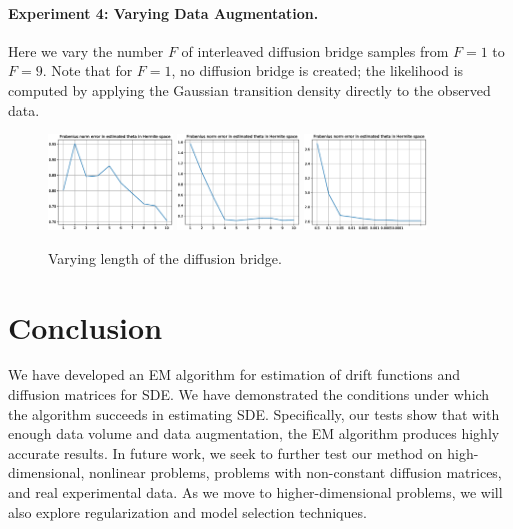 \documentclass{article}
\begin{document}
\paragraph{Experiment 4: Varying Data Augmentation.} 
Here we vary the number $F$ of interleaved diffusion bridge samples from $F=1$ to $F=9$.  Note that for $F=1$, no diffusion bridge is created; the likelihood is computed by applying the Gaussian transition density directly to the observed data.
\begin{figure}[th]
\includegraphics[height=1in]{../1dcode/varying_subintervals/plots/tp_51/hermite.eps}
\includegraphics[height=1in]{../2dcode/varying_subintervals/plots/tp_51/hermite.eps}
\includegraphics[height=1in]{../3ddampedduffing/varying_subintervals/plots/tp_51/hermite.eps}
\caption{Varying length of the diffusion bridge.}
\label{fig:exp2}
\end{figure}

\section{Conclusion} We have developed an EM algorithm for estimation of drift functions and diffusion matrices for SDE.  We have demonstrated the conditions under which the algorithm succeeds in estimating SDE.  Specifically, our tests show that with enough data volume and data augmentation, the EM algorithm produces highly accurate results.  In future work, we seek to further test our method on high-dimensional, nonlinear problems, problems with non-constant diffusion matrices, and real experimental data.  As we move to higher-dimensional problems, we will also explore regularization and model selection techniques.

\clearpage

{\small


}
\end{document}
